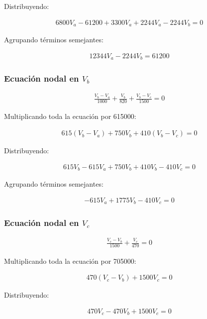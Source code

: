 \documentclass[conference]{IEEEtran}
\begin{document}
Distribuyendo:

\begin{align*}
6800V_a-61200+3300V_a+2244V_a-2244V_b=0
\end{align*}

Agrupando términos semejantes:

\begin{align*}
12344V_a-2244V_b=61200
\end{align*}

\subsubsection{Ecuación nodal en $V_b$}

\begin{align*}
\frac{V_b-V_a}{1000}+\frac{V_b}{820}+\frac{V_b-V_c}{1500}=0
\end{align*}

Multiplicando toda la ecuación por 615000:

\begin{align*}
615(V_b-V_a)+750V_b+410(V_b-V_c)=0
\end{align*}

Distribuyendo:

\begin{align*}
615V_b-615V_a+750V_b+410V_b-410V_c=0
\end{align*}

Agrupando términos semejantes:

\begin{align*}
-615V_a+1775V_b-410V_c=0
\end{align*}

\subsubsection{Ecuación nodal en $V_c$}

\begin{align*}
\frac{V_c-V_b}{1500}+\frac{V_c}{470}=0
\end{align*}

Multiplicando toda la ecuación por 705000:

\begin{align*}
470(V_c-V_b)+1500V_c=0
\end{align*}

Distribuyendo:

\begin{align*}
470V_c-470V_b+1500V_c=0
\end{align*}
\end{document}
